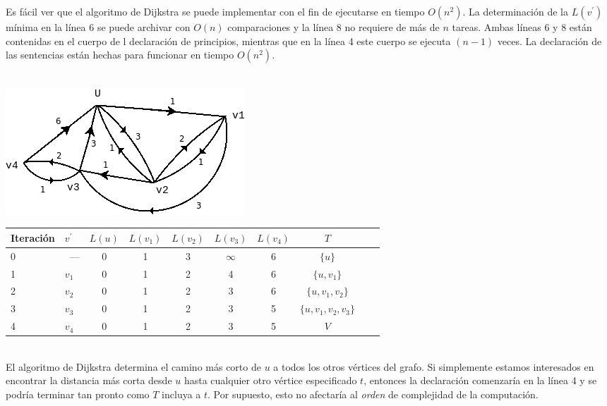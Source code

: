 \documentclass[10pt,a5paper]{book}
\begin{document}
Es fácil ver que el algoritmo de Dijkstra se puede implementar con el fin de ejecutarse en tiempo $O(n^2)$. La determinación de la $L(v^{'})$ mínima en la línea 6 se puede archivar con $O(n)$ comparaciones y la línea 8 no requiere de más de $n$ tareas. Ambas líneas 6 y 8 están contenidas en el cuerpo de l declaración de principios, mientras que en la línea 4 este cuerpo se ejecuta $(n-1)$ veces. La declaración de las sentencias están hechas para funcionar en tiempo $O(n^2)$.\\
\vfill
\pagebreak
\hrulefill{}\\
\begin{figure}
\caption{ }
\end{figure}
\begin{center}
\parbox{4cm}
{
  \hspace*{-.3in}\includegraphics[scale=0.49]{Figura1_11.png}
}
\end{center}
\begin{table}[!hbt]
\begin{tabular}{p{1.5cm}l|c c c c c c p{1cm}c}
Iteración & $v^{'}$ & $L(u)$ & $L(v_1)$ & $L(v_2)$ & $L(v_3)$ & $L(v_4)$ & $T$ \\
\hline
0 & ~--- & 0 & 1 & 3 & $\infty$ & 6 & $\{u\}$ \\
1 & $v_1$ & 0 & 1 & 2 & 4 & 6 & $\{u,v_1\}$ \\
2 & $v_2$ & 0 & 1 & 2 & 3 & 6 & $\{u,v_1,v_2\}$ \\
3 & $v_3$ & 0 & 1 & 2 & 3 & 5 & $\{u,v_1,v_2,v_3\}$ \\
4 & $v_4$ & 0 & 1 & 2 & 3 & 5 & $V$\\
\end{tabular}
\end{table}
\hrulefill{}\\
El algoritmo de Dijkstra determina el camino más corto de $u$ a todos los otros vértices del grafo. Si simplemente estamos interesados en encontrar la distancia más corta desde $u$ hasta cualquier otro vértice especificado $t$, entonces la declaración comenzaría en la línea 4 y se podría terminar tan pronto como $T$ incluya a $t$. Por supuesto, esto no afectaría al \emph{orden} de complejidad de la computación.
\end{document}

